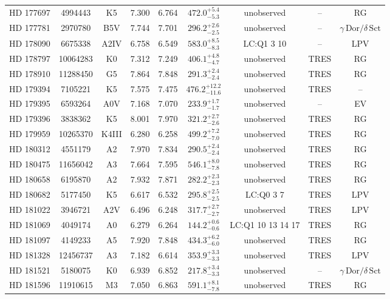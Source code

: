 \begin{table*}
\begin{tabular}{ccccccccc}
HD 177697 & 4994443 & K5 & 7.300 & 6.764 & $472.0^{+5.4}_{-5.3}$ & unobserved & -- & RG \\
HD 177781 & 2970780 & B5V & 7.744 & 7.701 & $296.2^{+2.6}_{-2.5}$ & unobserved & -- & $\gamma\,\text{Dor} /\delta\,\text{Sct}$ \\
HD 178090 & 6675338 & A2IV & 6.758 & 6.549 & $583.0^{+8.5}_{-8.3}$ & LC:Q1 3 10 & -- & LPV \\
HD 178797 & 10064283 & K0 & 7.312 & 7.249 & $406.1^{+4.8}_{-4.7}$ & unobserved & TRES & RG \\
HD 178910 & 11288450 & G5 & 7.864 & 7.848 & $291.3^{+2.4}_{-2.4}$ & unobserved & TRES & RG \\
HD 179394 & 7105221 & K5 & 7.575 & 7.475 & $476.2^{+12.2}_{-11.6}$ & unobserved & TRES & -- \\
HD 179395 & 6593264 & A0V & 7.168 & 7.070 & $233.9^{+1.7}_{-1.7}$ & unobserved & -- & EV \\
HD 179396 & 3838362 & K5 & 8.001 & 7.970 & $321.2^{+2.7}_{-2.6}$ & unobserved & TRES & RG \\
HD 179959 & 10265370 & K4III & 6.280 & 6.258 & $499.2^{+7.2}_{-7.0}$ & unobserved & TRES & RG \\
HD 180312 & 4551179 & A2 & 7.970 & 7.834 & $290.5^{+2.4}_{-2.4}$ & unobserved & TRES & RG \\
HD 180475 & 11656042 & A3 & 7.664 & 7.595 & $546.1^{+8.0}_{-7.8}$ & unobserved & TRES & RG \\
HD 180658 & 6195870 & A2 & 7.932 & 7.871 & $282.2^{+2.3}_{-2.3}$ & unobserved & TRES & RG \\
HD 180682 & 5177450 & K5 & 6.617 & 6.532 & $295.8^{+2.5}_{-2.5}$ & LC:Q0 3 7 & TRES & LPV \\
HD 181022 & 3946721 & A2V & 6.496 & 6.248 & $317.7^{+2.7}_{-2.7}$ & unobserved & TRES & LPV \\
HD 181069 & 4049174 & A0 & 6.279 & 6.264 & $144.2^{+0.6}_{-0.6}$ & LC:Q1 10 13 14 17 & TRES & RG \\
HD 181097 & 4149233 & A5 & 7.920 & 7.848 & $434.3^{+6.2}_{-6.0}$ & unobserved & TRES & RG \\
HD 181328 & 12456737 & A3 & 7.182 & 6.614 & $353.9^{+3.3}_{-3.3}$ & unobserved & TRES & LPV \\
HD 181521 & 5180075 & K0 & 6.939 & 6.852 & $217.8^{+3.4}_{-3.3}$ & unobserved & -- & $\gamma\,\text{Dor} /\delta\,\text{Sct}$ \\
HD 181596 & 11910615 & M3 & 7.050 & 6.863 & $591.1^{+8.1}_{-7.8}$ & unobserved & TRES & RG \\

\end{tabular}
\end{table*}
